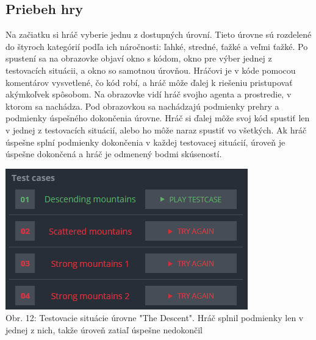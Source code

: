 \documentclass[slovak,a4paper,11pt]{article}
\begin{document}
\subsection{Priebeh hry}
Na začiatku si hráč vyberie jednu z dostupných úrovní. Tieto úrovne sú rozdelené do štyroch kategórií podľa ich náročnosti: ľahké, stredné, ťažké a veľmi ťažké. Po spustení sa na obrazovke objaví okno s kódom, okno pre výber jednej z testovacích situácii, a okno so samotnou úrovňou. Hráčovi je v kóde pomocou komentárov vysvetlené, čo kód robí, a hráč môže ďalej k riešeniu pristupovať akýmkoľvek spôsobom. Na obrazovke vidí hráč svojho agenta a prostredie, v ktorom sa nachádza. Pod obrazovkou sa nachádzajú podmienky prehry a podmienky úspešného dokončenia úrovne. Hráč si ďalej môže svoj kód spustiť len v jednej z testovacích situácií, alebo ho môže naraz spustiť vo všetkých. Ak hráč úspešne splní podmienky dokončenia v každej testovacej situácií, úroveň je úspešne dokončená a hráč je odmenený bodmi skúseností.\\
\begin{center}
\includegraphics[scale=0.6]{codingametest}
\\ Obr. 12: Testovacie situácie úrovne "The Descent". Hráč splnil podmienky len v jednej z nich, takže úroveň zatiaľ úspešne nedokončil
\end{center}
\end{document}
